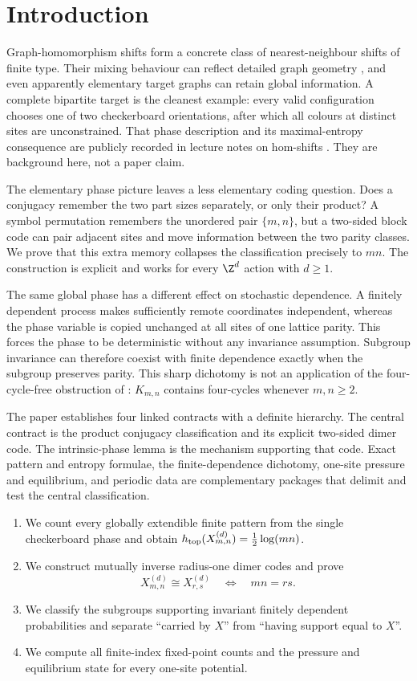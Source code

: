 \section{Introduction}

Graph-homomorphism shifts form a concrete class of nearest-neighbour shifts
of finite type.  Their mixing behaviour can reflect detailed graph geometry
\citep{ChandgotiaMarcus2018}, and even apparently elementary target graphs can
retain global information.  A complete bipartite target is the cleanest
example: every valid configuration chooses one of two checkerboard
orientations, after which all colours at distinct sites are unconstrained.
That phase description and its maximal-entropy consequence are publicly
recorded in lecture notes on hom-shifts \citep{Chandgotia2019Lectures}.  They
are background here, not a paper claim.

The elementary phase picture leaves a less elementary coding question.
Does a conjugacy remember the two part sizes separately, or only their
product?  A symbol permutation remembers the unordered pair $\{m,n\}$, but a
two-sided block code can pair adjacent sites and move information between
the two parity classes.  We prove that this extra memory collapses the
classification precisely to $mn$.  The construction is explicit and works
for every $\Z^d$ action with $d\geq1$.

The same global phase has a different effect on stochastic dependence.  A
finitely dependent process makes sufficiently remote coordinates
independent, whereas the phase variable is copied unchanged at all sites of
one lattice parity.  This forces the phase to be deterministic without any
invariance assumption.  Subgroup invariance can therefore coexist with
finite dependence exactly when the subgroup preserves parity.  This sharp
dichotomy is not an application of the four-cycle-free obstruction of
\citet{ChandgotiaThorat2026}: $K_{m,n}$ contains four-cycles whenever
$m,n\geq2$.

The paper establishes four linked contracts with a definite hierarchy.  The
central contract is the product conjugacy classification and its explicit
two-sided dimer code.  The intrinsic-phase lemma is the mechanism supporting
that code.  Exact pattern and entropy formulae, the finite-dependence
dichotomy, one-site pressure and equilibrium, and periodic data are
complementary packages that delimit and test the central classification.
\begin{enumerate}
\item We count every globally extendible finite pattern from the single
checkerboard phase and obtain
$h_{\rm top}(X_{m,n}^{(d)})=\frac12\log(mn)$.
\item We construct mutually inverse radius-one dimer codes and prove
\[
X_{m,n}^{(d)}\cong X_{r,s}^{(d)}\quad\Longleftrightarrow\quad mn=rs.
\]
\item We classify the subgroups supporting invariant finitely dependent
probabilities and separate ``carried by $X$'' from ``having support equal to
$X$''.
\item We compute all finite-index fixed-point counts and the pressure and
equilibrium state for every one-site potential.
\end{enumerate}

